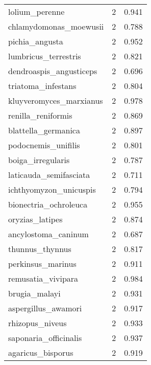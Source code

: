\begin{tabular}{lrr}
                 lolium\_perenne &                   2 &     0.941 \\
         chlamydomonas\_moewusii &                   2 &     0.788 \\
                 pichia\_angusta &                   2 &     0.952 \\
           lumbricus\_terrestris &                   2 &     0.821 \\
        dendroaspis\_angusticeps &                   2 &     0.696 \\
             triatoma\_infestans &                   2 &     0.804 \\
        kluyveromyces\_marxianus &                   2 &     0.978 \\
             renilla\_reniformis &                   2 &     0.869 \\
            blattella\_germanica &                   2 &     0.897 \\
            podocnemis\_unifilis &                   2 &     0.801 \\
              boiga\_irregularis &                   2 &     0.787 \\
         laticauda\_semifasciata &                   2 &     0.711 \\
         ichthyomyzon\_unicuspis &                   2 &     0.794 \\
          bionectria\_ochroleuca &                   2 &     0.955 \\
                oryzias\_latipes &                   2 &     0.874 \\
            ancylostoma\_caninum &                   2 &     0.687 \\
                thunnus\_thynnus &                   2 &     0.817 \\
              perkinsus\_marinus &                   2 &     0.911 \\
             remusatia\_vivipara &                   2 &     0.984 \\
                  brugia\_malayi &                   2 &     0.931 \\
            aspergillus\_awamori &                   2 &     0.917 \\
                rhizopus\_niveus &                   2 &     0.933 \\
          saponaria\_officinalis &                   2 &     0.937 \\
              agaricus\_bisporus &                   2 &     0.919 \\

\end{tabular}
